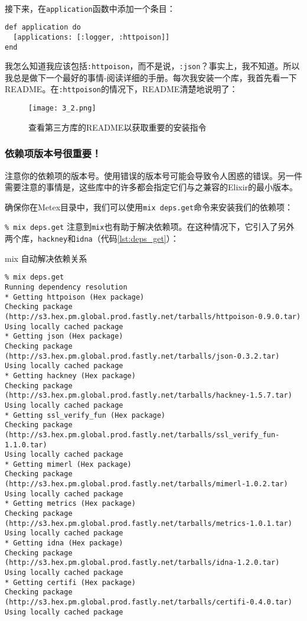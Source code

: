 \

接下来，在\texttt{application}函数中添加一个条目：

\begin{code}{}
\begin{verbatim}
def application do
  [applications: [:logger, :httpoison]]
end
\end{verbatim}
\end{code}

我怎么知道我应该包括\texttt{:httpoison}，而不是说，\texttt{:json}？事实上，我不知道。所以我总是做下一个最好的事情-阅读详细的手册。每次我安装一个库，我首先看一下README。在\texttt{:httpoison}的情况下，README清楚地说明了：

\begin{figure}[!ht]
    \centering
    \texttt{[image: 3\_2.png]}
    \caption{查看第三方库的README以获取重要的安装指令}
    \label{fig:3_2}
\end{figure}

\subsubsection{依赖项版本号很重要！}

注意你的依赖项的版本号。使用错误的版本号可能会导致令人困惑的错误。另一件需要注意的事情是，这些库中的许多都会指定它们与之兼容的Elixir的最小版本。

确保你在Metex目录中，我们可以使用\texttt{mix deps.get}命令来安装我们的依赖项：

\texttt{\% mix deps.get}
注意到\texttt{mix}也有助于解决依赖项。在这种情况下，它引入了另外两个库，\texttt{hackney}和\texttt{idna}（代码\ref{lst:deps_get}）：

\begin{code}{mix 自动解决依赖关系}
\begin{verbatim}
% mix deps.get
Running dependency resolution
* Getting httpoison (Hex package)
Checking package (http://s3.hex.pm.global.prod.fastly.net/tarballs/httpoison-0.9.0.tar)
Using locally cached package
* Getting json (Hex package)
Checking package (http://s3.hex.pm.global.prod.fastly.net/tarballs/json-0.3.2.tar)
Using locally cached package
* Getting hackney (Hex package)
Checking package (http://s3.hex.pm.global.prod.fastly.net/tarballs/hackney-1.5.7.tar)
Using locally cached package
* Getting ssl_verify_fun (Hex package)
Checking package (http://s3.hex.pm.global.prod.fastly.net/tarballs/ssl_verify_fun-1.1.0.tar)
Using locally cached package
* Getting mimerl (Hex package)
Checking package (http://s3.hex.pm.global.prod.fastly.net/tarballs/mimerl-1.0.2.tar)
Using locally cached package
* Getting metrics (Hex package)
Checking package (http://s3.hex.pm.global.prod.fastly.net/tarballs/metrics-1.0.1.tar)
Using locally cached package
* Getting idna (Hex package)
Checking package (http://s3.hex.pm.global.prod.fastly.net/tarballs/idna-1.2.0.tar)
Using locally cached package
* Getting certifi (Hex package)
Checking package (http://s3.hex.pm.global.prod.fastly.net/tarballs/certifi-0.4.0.tar)
Using locally cached package
\end{verbatim}
\label{lst:deps_get}
\end{code}

